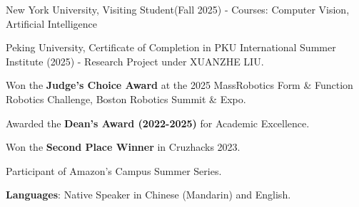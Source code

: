 \begin{cventries}
  \cvend
    {
      \begin{cvitems} %
        \item {New York University, Visiting Student(Fall 2025) - Courses: Computer Vision, Artificial Intelligence}
        \item {Peking University, Certificate of Completion in PKU International Summer Institute (2025) - Research Project under XUANZHE LIU.}
        \item {Won the \textbf{Judge's Choice Award} at the 2025 MassRobotics Form \& Function Robotics Challenge, Boston Robotics Summit \& Expo.}
        \item {Awarded the \textbf{Dean's Award (2022-2025)} for Academic Excellence.}
        \item {Won the \textbf{Second Place Winner} in Cruzhacks 2023.}
        \item {Participant of Amazon's Campus Summer Series.}
        \item {\textbf{Languages}: Native Speaker in Chinese (Mandarin) and English.}
      \end{cvitems}
    }
\end{cventries}
